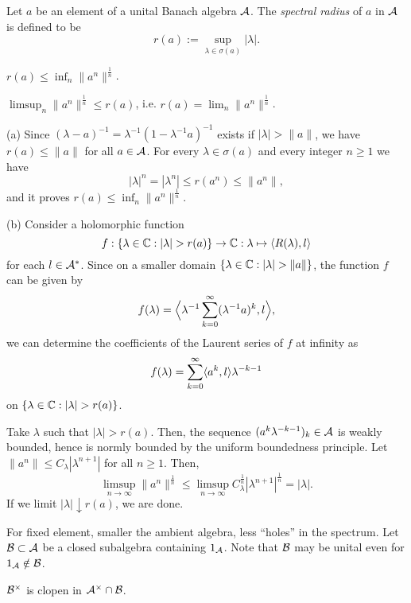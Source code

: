 \documentclass{../../large}
\begin{document}
\begin{prb}
Let $a$ be an element of a unital Banach algebra $\mathcal{A}$.
The \emph{spectral radius} of $a$ in $\mathcal{A}$ is defined to be
\[r(a):=\sup_{\lambda\in\sigma(a)}|\lambda|.\]
\begin{parts}
\item $r(a)\le\inf_n\|a^n\|^{\frac1n}$.
\item $\limsup_n\|a^n\|^{\frac1n}\le r(a)$, i.e. $r(a)=\lim_n\|a^n\|^{\frac1n}$.
\end{parts}
\end{prb}
\begin{pf}
(a)
Since $(\lambda-a)^{-1}=\lambda^{-1}(1-\lambda^{-1}a)^{-1}$ exists if $|\lambda|>\|a\|$, we have $r(a)\le\|a\|$ for all $a\in\mathcal{A}$.
For every $\lambda\in\sigma(a)$ and every integer $n\ge1$ we have
\[|\lambda|^n=|\lambda^n|\le r(a^n)\le\|a^n\|,\]
and it proves $r(a)\le\inf_n\|a^n\|^{\frac1n}$.

(b)
Consider a holomorphic function
\[f:\{\lambda\in\C:|\lambda|>r(a)\}\to\C:\lambda\mapsto\<R(\lambda),l\>\]
for each $l\in\mathcal{A}^*$.
Since on a smaller domain $\{\lambda\in\C:|\lambda|>\|a\|\}$, the function $f$ can be given by
\[f(\lambda)=\Bigl\langle\lambda^{-1}\sum_{k=0}^\infty(\lambda^{-1}a)^k,l\Bigr\rangle,\]
we can determine the coefficients of the Laurent series of $f$ at infinity as
\[f(\lambda)=\sum_{k=0}^\infty\langle a^k,l\rangle\lambda^{-k-1}\]
on $\{\lambda\in\C:|\lambda|>r(a)\}$.

Take $\lambda$ such that $|\lambda|>r(a)$.
Then, the sequence $(a^k\lambda^{-k-1})_k\in\mathcal{A}$ is weakly bounded, hence is normly bounded by the uniform boundedness principle.
Let $\|a^n\|\le C_\lambda|\lambda^{n+1}|$ for all $n\ge1$.
Then,
\[\limsup_{n\to\infty}\|a^n\|^{\frac1n}\le\limsup_{n\to\infty}C_\lambda^{\frac1n}|\lambda^{n+1}|^{\frac1n}=|\lambda|.\]
If we limit $|\lambda|\downarrow r(a)$, we are done.
\end{pf}

\begin{prb}
For fixed element, smaller the ambient algebra, less ``holes'' in the spectrum.
Let $\mathcal{B}\subset\mathcal{A}$ be a closed subalgebra containing $1_{\mathcal{A}}$.
Note that $\mathcal{B}$ may be unital even for $1_{\mathcal{A}}\notin\mathcal{B}$.
\begin{parts}
\item $\mathcal{B}^\times$ is clopen in $\mathcal{A}^\times\cap\mathcal{B}$.
\end{parts}
\end{prb}
\end{document}

